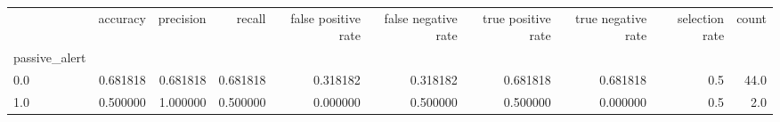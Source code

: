 \begin{tabular}{lrrrrrrrrr}
\toprule
{} &  accuracy &  precision &    recall &  false positive rate &  false negative rate &  true positive rate &  true negative rate &  selection rate &  count \\
passive\_alert &           &            &           &                      &                      &                     &                     &                 &        \\
\midrule
0.0           &  0.681818 &   0.681818 &  0.681818 &             0.318182 &             0.318182 &            0.681818 &            0.681818 &             0.5 &   44.0 \\
1.0           &  0.500000 &   1.000000 &  0.500000 &             0.000000 &             0.500000 &            0.500000 &            0.000000 &             0.5 &    2.0 \\
\bottomrule
\end{tabular}
